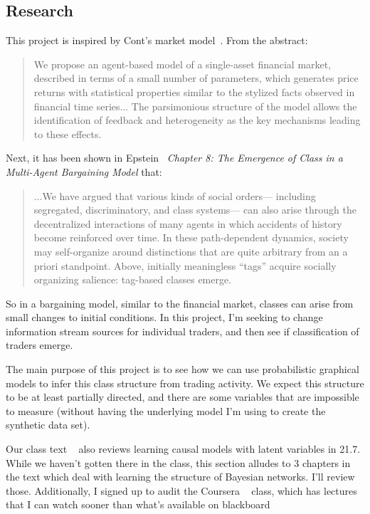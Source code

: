 \documentclass[a4paper, 11pt]{report}
\begin{document}
\subsection{Research}
This project is inspired by Cont's market model~\cite{ghoulmie_cont_nadal_2005}. From the abstract:
\begin{quote} 
	We propose an agent-based model of a single-asset financial market, described in terms of a small number of parameters, which generates price returns with statistical properties similar to the stylized facts observed in financial time series... The parsimonious structure of the model allows the identification of feedback and heterogeneity as the key mechanisms leading to these effects. 
\end{quote}
Next, it has been shown in Epstein~\cite{epstein2007generative} \textit{Chapter 8: The Emergence of Class in a Multi-Agent Bargaining Model} that:
\begin{quote}
	...We have argued that various kinds of social orders— including segregated, discriminatory, and class systems— can also arise through the decentralized interactions of many agents in which accidents of history become reinforced over time. In these path-dependent dynamics, society may self-organize around distinctions that are quite arbitrary from an a priori standpoint. Above, initially meaningless “tags” acquire socially organizing salience: tag-based classes emerge.
\end{quote}
	So in a bargaining model, similar to the financial market, classes can arise from small changes to initial conditions. In this project, I'm seeking to change information stream sources for individual traders, and then see if classification of traders emerge. 
	
	The main purpose of this project is to see how we can use probabilistic graphical models to infer this class structure from trading activity. We expect this structure to be at least partially directed, and there are some variables that are impossible to measure (without having the underlying model I'm using to create the synthetic data set). 
	
	Our class text ~\cite{koller2009} also reviews learning causal models with latent variables in 21.7. While we haven't gotten there in the class, this section alludes to 3 chapters in the text which deal with learning the structure of Bayesian networks. I'll review those. Additionally, I signed up to audit the Coursera ~\cite{coursera} class, which has lectures that I can watch sooner than what's available on blackboard
	
\end{document}
